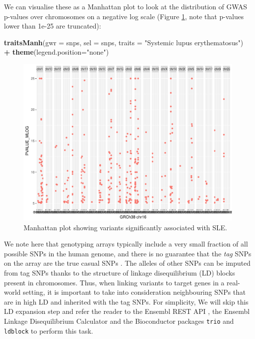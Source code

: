 \documentclass[9pt,a4paper,]{extarticle}
\newenvironment{Shaded}{\begin{snugshade}}{\end{snugshade}}
\newcommand{\KeywordTok}[1]{\textcolor[rgb]{0.13,0.29,0.53}{\textbf{#1}}}
\newcommand{\DataTypeTok}[1]{\textcolor[rgb]{0.13,0.29,0.53}{#1}}
\newcommand{\StringTok}[1]{\textcolor[rgb]{0.31,0.60,0.02}{#1}}
\newcommand{\OperatorTok}[1]{\textcolor[rgb]{0.81,0.36,0.00}{\textbf{#1}}}
\newcommand{\NormalTok}[1]{#1}
\begin{document}
We can visualise these as a Manhattan plot to look at the distribution of GWAS p-values over chromosomes on a negative log scale (Figure \ref{fig:manhattan}, note that p-values lower than 1e-25 are truncated):

\begin{Shaded}
\begin{Highlighting}[]
\KeywordTok{traitsManh}\NormalTok{(}\DataTypeTok{gwr =}\NormalTok{ snps, }\DataTypeTok{sel =}\NormalTok{ snps, }\DataTypeTok{traits =} \StringTok{"Systemic lupus erythematosus"}\NormalTok{) }\OperatorTok{+}
\StringTok{  }\KeywordTok{theme}\NormalTok{(}\DataTypeTok{legend.position=}\StringTok{"none"}\NormalTok{)}
\end{Highlighting}
\end{Shaded}

\begin{figure}

{\centering \includegraphics{biocondutor-regulatory-genomics-workflow_files/figure-latex/manhattan-1} 

}

\caption{Manhattan plot showing variants significantly associated with SLE.}\label{fig:manhattan}
\end{figure}

We note here that genotyping arrays typically include a very small fraction of all possible SNPs in the human genome, and there is no guarantee that the \emph{tag} SNPs on the array are the true casual SNPs \citep{Bush2012}.
The alleles of other SNPs can be imputed from tag SNPs thanks to the structure of linkage disequilibrium (LD) blocks present in chromosomes.
Thus, when linking variants to target genes in a real-world setting, it is important to take into consideration neighbouring SNPs that are in high LD and inherited with the tag SNPs.
For simplicity, We will skip this LD expansion step and refer the reader to the Ensembl REST API \citep{Yates2015, Ensembl2017a}, the Ensembl Linkage Disequilibrium Calculator \citep{Ensembl2017b} and the Bioconductor packages \texttt{trio} \citep{Schwender2015} and \texttt{ldblock} \citep{Carey2017c} to perform this task.
\end{document}
